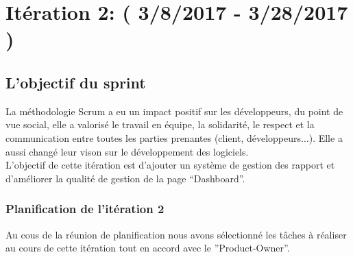 \section{Itération 2: ( 3/8/2017 - 3/28/2017 )}

\subsection{L'objectif du sprint}
La méthodologie Scrum a eu un impact positif sur les développeurs, du point de vue social, elle
a valorisé le travail en équipe, la solidarité, le respect et la communication entre toutes les
parties prenantes (client, développeurs...). Elle a aussi changé leur vison sur le développement
des logiciels.\\
L'objectif de cette itération est d'ajouter un système de gestion des rapport et d'améliorer
la qualité de gestion de la page ``Dashboard''.
  \subsubsection{Planification de l'itération 2}
  Au cous de la réunion de planification nous avons sélectionné les tâches à réaliser au
  cours de cette itération tout en accord avec le ”Product-Owner”.
